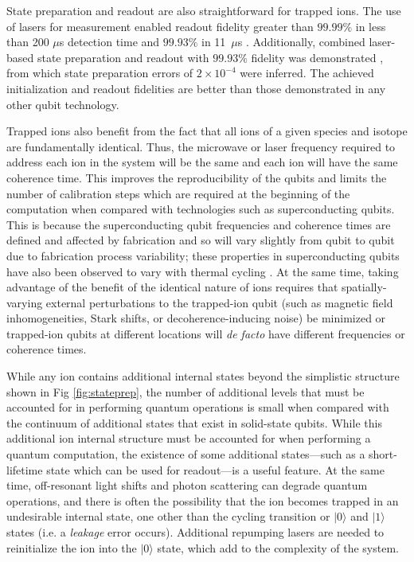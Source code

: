 \documentclass[%
12pt,
 amsmath,amssymb,
]{revtex4-2}
\newcommand{\zero}{|0 \rangle}
\newcommand{\one}{|1 \rangle}
\begin{document}
State preparation and readout are also straightforward for trapped ions. The use of lasers for measurement enabled readout fidelity greater than $99.99 \%$ in less than 200 $\mu$s detection time \cite{MyersonReadoutIons2008} and $99.93\%$ in 11~$\mu$s \cite{CrainSNSPDdetect2019}.  Additionally, combined laser-based state preparation and readout with $99.93 \%$ fidelity was demonstrated \cite{HartyHighFidelityIons2014}, from which state preparation errors of $2 \times 10^{-4}$ were inferred. The achieved initialization and readout fidelities are better than those demonstrated in any other qubit technology.

Trapped ions also benefit from the fact that all ions of a given species and isotope are fundamentally identical. Thus, the microwave or laser frequency required to address each ion in the system will be the same and each ion will have the same coherence time.  This improves the reproducibility of the qubits and limits the number of calibration steps which are required at the beginning of the computation when compared with technologies such as superconducting qubits.  This is because the superconducting qubit frequencies and coherence times are defined and affected by fabrication and so will vary slightly from qubit to qubit due to fabrication process variability; these properties in superconducting qubits have also been observed to vary with thermal cycling \cite{KilmovGoogleSCqubitvary2018}.  At the same time, taking advantage of the benefit of the identical nature of ions requires that spatially-varying external perturbations to the trapped-ion qubit (such as magnetic field inhomogeneities, Stark shifts, or decoherence-inducing noise) be minimized or trapped-ion qubits at different locations will \emph{de facto} have different frequencies or coherence times.

While any ion contains additional internal states beyond the simplistic structure shown in Fig \ref{fig:stateprep}, the number of additional levels that must be accounted for in performing quantum operations is small when compared with the continuum of additional states that exist in solid-state qubits. While this additional ion internal structure must be accounted for when performing a quantum computation, the existence of some additional states---such as a short-lifetime state which can be used for readout---is a useful feature. At the same time, off-resonant light shifts and photon scattering can degrade quantum operations, and there is often the possibility that the ion becomes trapped in an undesirable internal state, one other than the cycling transition or $\zero$ and $\one$ states (i.e. a \emph{leakage} error occurs). Additional repumping lasers are needed to reinitialize the ion into the $\zero$ state, which add to the complexity of the system.
\end{document}
